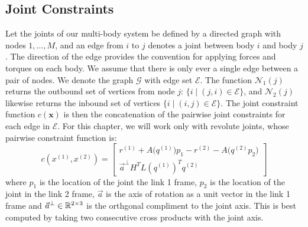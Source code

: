 \documentclass[../root.tex]{subfiles}
\begin{document}
\subsection{Joint Constraints}
Let the joints of our multi-body system be defined by a directed graph with nodes $1,\dots,M$,
and an edge from $i$ to $j$ denotes a joint between body $i$ and body $j$. The direction 
of the edge provides the convention for applying forces and torques on each body. We assume 
that there is only ever a single edge between a pair of nodes. We denote the graph 
$\mathcal{G}$ with edge set $\mathcal{E}$. The function $\mathcal{N}_1(j)$ returns the
outbound set of vertices from node $j$: $\{i \mid (j,i) \in \mathcal{E}\}$, 
and $\mathcal{N}_2(j)$ likewise returns the inbound set of vertices 
$\{ i \mid (i,j) \in \mathcal{E}\}$. The joint constraint function $c(\mathbf{x})$ is then 
the concatenation of the pairwise joint constraints for each edge in $\mathcal{E}$. For 
this chapter, we will work only with revolute joints, whose pairwise constraint function is:
\begin{equation}
    c(x^{(1)}, x^{(2)}) = \begin{bmatrix}
        r^{(1)} + A \big( q^{(1)} \big) p_1 - r^{(2)} - A \big( q^{(2)} p_2 \big) \\
        \vec{a}^\perp H^T L(q^{(1)})^T q^{(2)}
    \end{bmatrix}
\end{equation}
where $p_1$ is the location of the joint the link 1 frame, $p_2$ is the location of the 
joint in the link 2 frame, $\vec{a}$ is the axis of rotation as a unit vector in the 
link 1 frame and $\vec{a}^\perp \in \mathbb{R}^{2 \times 3}$ is the orthgonal compliment to the 
joint axis. This is best computed by taking two consecutive cross products with the joint 
axis. 
\end{document}

